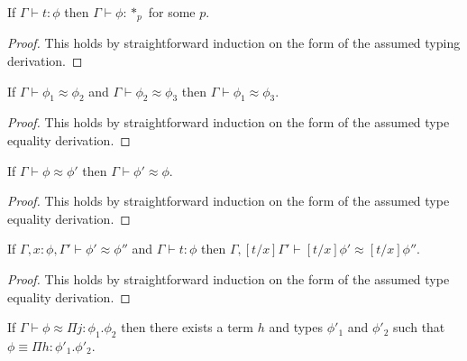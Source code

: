 \begin{lemma}[Regularity]
  If $\Gamma \vdash t:\phi$ then $\Gamma \vdash \phi:*_p$ for some $p$.
  \label{lemma:regularity_ssfe}
\end{lemma}
\begin{proof}
  This holds by straightforward induction on the form of the assumed
  typing derivation.
\end{proof}
\begin{lemma}
  \label{lemma:transitivity_of_type_equality_ssfe}
  If $\Gamma \vdash \phi_1 \approx \phi_2$ and $\Gamma \vdash \phi_2 \approx \phi_3$ then
  $\Gamma \vdash \phi_1 \approx \phi_3$.
\end{lemma}
\begin{proof}
  This holds by straightforward induction on the form of the assumed
  type equality derivation.
\end{proof}
\begin{lemma}
  \label{lemma:symmetry_of_type_equality}
  If $\Gamma \vdash \phi \approx \phi'$ then $\Gamma \vdash \phi' \approx \phi$.
\end{lemma}
\begin{proof}
  This holds by straightforward induction on the form of the assumed
  type equality derivation.
\end{proof}
\begin{lemma}
  \label{lemma:substitution_for_type_equality_ssfe}
  If $\Gamma,x:\phi,\Gamma' \vdash \phi' \approx \phi''$ and $\Gamma \vdash t:\phi$ then
  $\Gamma,[t/x]\Gamma' \vdash [t/x]\phi' \approx [t/x]\phi''$.
\end{lemma}
\begin{proof}
  This holds by straightforward induction on the form of the assumed
  type equality derivation.
\end{proof}
\begin{lemma}[]
  \label{lemma:pis_are_equal_to_pis_ssfe}
  If $\Gamma \vdash \phi \approx \Pi j:\phi_1.\phi_2$ then there exists a term $h$ and types $\phi'_1$ and $\phi'_2$
  such that $\phi \equiv \Pi h:\phi'_1.\phi'_2$.
\end{lemma}
